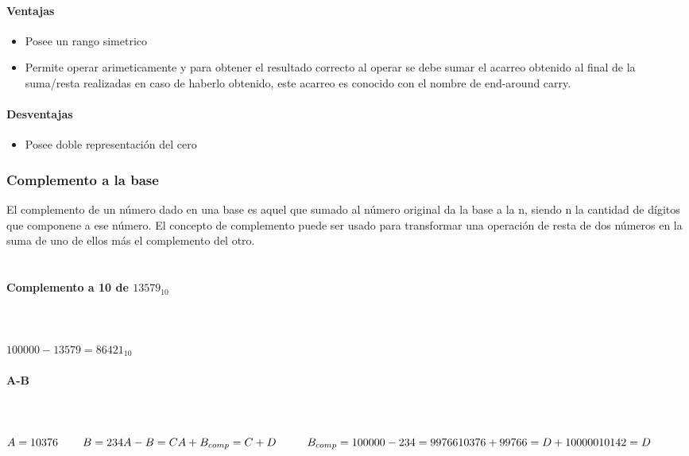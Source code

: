 \paragraph{Ventajas}
\begin{itemize}
\item Posee un rango simetrico
\item Permite operar arimeticamente y para obtener el resultado correcto al operar se debe sumar el acarreo obtenido al final de la suma/resta realizadas en caso de haberlo obtenido, este acarreo es conocido con el nombre de end-around carry.
\end{itemize}

\paragraph{Desventajas}
\begin{itemize}
\item Posee doble representación del cero
\end{itemize}

\subsubsection{Complemento a la base}
El complemento de un número dado en una base es aquel que sumado al número original da la base a la n, siendo n la cantidad de dígitos que componene a ese número. El concepto de complemento puede ser usado para transformar una operación de resta de dos números en la suma de uno de ellos más el complemento del otro.\\\\

\paragraph{Complemento a 10 de $13579_{10}$}\mbox{}\\\\
$100000 - 13579 = 86421_{10}$

\paragraph{A-B}\mbox{}\\\\
$
A = 10376 \;\;\;\;\;\;\;\;B = 234\\
A-B = C\\
A+B_{comp} = C+D  \;\;\;\;\;\;\;\;\;\; B_{comp} = 100000-234=99766\\
10376 + 99766 = D + 100000\\
10142 = D\\
$

